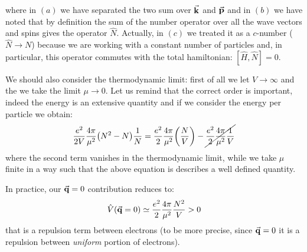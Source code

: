 \documentclass[../main/main.tex]{subfiles}
\begin{document}
where in \( (a) \) we have separated the two sum over   \( \va{k} \) and \( \va{p} \) and in \( (b) \) we have noted that by definition the sum of the number operator over all the wave vectors and spins gives the operator \( \hat{N}  \).
Actually, in \( (c) \)  we treated it as a \( c \)-number (\( \hat{N} \rightarrow N  \)) because we are working with a constant number of particles and, in particular, this operator commutes with the total hamiltonian: \( [\hat{H},\hat{N}  ] = 0 \).




We should also consider the thermodynamic limit: first of all we let \( V \rightarrow \infty  \) and the we take the limit \( \mu \rightarrow 0 \). Let us remind that the correct order is important, indeed the energy is an extensive quantity and if we consider the energy per particle we obtain:
\begin{equation*}
  \frac{e^2}{2V}  \frac{4 \pi }{\mu ^2} \qty(N^2-N) \frac{1}{N}
  = \frac{e^2}{2}  \frac{4 \pi }{\mu ^2} \qty(\frac{N}{V}) - \cancel{\frac{e^2}{2}  \frac{4 \pi }{\mu ^2} \frac{1}{V}}
\end{equation*}
where the second term vanishes in the thermodynamic limit, while we take \( \mu  \) finite in a way such that the above equation is describes a well defined quantity.

In practice, our \( \va{q}=0 \) contribution reduces to:
\begin{equation*}
  \hat{V} (\va{q}=0) \simeq \frac{e^2}{2} \frac{4 \pi }{\mu ^2} \frac{N^2}{V}>0
\end{equation*}
that is a repulsion term between electrons (to be more precise, since \( \va{q}=0 \)  it is a repulsion between \emph{uniform} portion of electrons).
\end{document}
